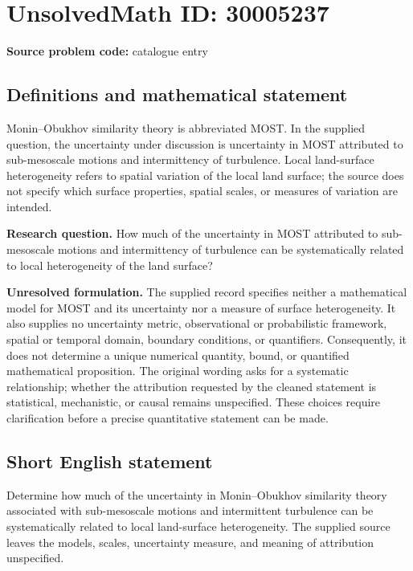 \documentclass[11pt]{article}
\begin{document}
\section*{UnsolvedMath ID: 30005237}
\textbf{Source problem code:} catalogue entry
\subsection{Definitions and mathematical statement}
Monin--Obukhov similarity theory is abbreviated MOST. In the supplied question, the uncertainty under discussion is uncertainty in MOST attributed to sub-mesoscale motions and intermittency of turbulence. Local land-surface heterogeneity refers to spatial variation of the local land surface; the source does not specify which surface properties, spatial scales, or measures of variation are intended.

\textbf{Research question.} How much of the uncertainty in MOST attributed to sub-mesoscale motions and intermittency of turbulence can be systematically related to local heterogeneity of the land surface?

\textbf{Unresolved formulation.} The supplied record specifies neither a mathematical model for MOST and its uncertainty nor a measure of surface heterogeneity. It also supplies no uncertainty metric, observational or probabilistic framework, spatial or temporal domain, boundary conditions, or quantifiers. Consequently, it does not determine a unique numerical quantity, bound, or quantified mathematical proposition. The original wording asks for a systematic relationship; whether the attribution requested by the cleaned statement is statistical, mechanistic, or causal remains unspecified. These choices require clarification before a precise quantitative statement can be made.
\subsection{Short English statement}
Determine how much of the uncertainty in Monin--Obukhov similarity theory associated with sub-mesoscale motions and intermittent turbulence can be systematically related to local land-surface heterogeneity. The supplied source leaves the models, scales, uncertainty measure, and meaning of attribution unspecified.
\end{document}
